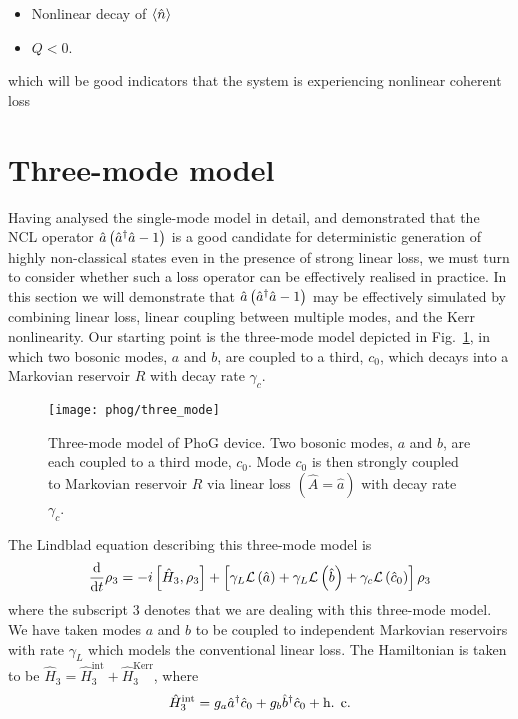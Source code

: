 \begin{itemize}
\item Nonlinear decay of $\ev{\hat{n}}$
\item $Q < 0$.
\end{itemize}

\noindent which will be good indicators that the system is experiencing nonlinear coherent loss





\section{Three-mode model}
Having analysed the single-mode model in detail, and demonstrated that the NCL operator $\hat{a}\left(\hat{a}^\dagger \hat{a} - 1\right)$ is a good candidate for deterministic generation of highly non-classical states even in the presence of strong linear loss, we must turn to consider whether such a loss operator can be effectively realised in practice. In this section we will demonstrate that $\hat{a}\left(\hat{a}^\dagger \hat{a} - 1\right)$ may be effectively simulated by combining linear loss, linear coupling between multiple modes, and the Kerr nonlinearity. Our starting point is the three-mode model depicted in Fig.~\ref{fig:phog_three_mode}, in which two bosonic modes, $a$ and $b$, are coupled to a third, $c_0$, which decays into a Markovian reservoir $R$ with decay rate $\gamma_c$. 

\begin{figure}[htp]
\centering
\texttt{[image: phog/three\_mode]}
\caption{\label{fig:phog_three_mode} Three-mode model of PhoG device. Two bosonic modes, $a$ and $b$, are each coupled to a third mode, $c_0$. Mode $c_0$ is then strongly coupled to Markovian reservoir $R$ via linear loss $\left(\hat{A} = \hat{a}\right)$ with decay rate $\gamma_c$. }
\end{figure}

The Lindblad equation describing this three-mode model is
\begin{equation}\label{eqn:phog_lindblad_three_mode_model}
\frac{\mathrm{d}}{\mathrm{d}t} \rho_3 = - i \left[ \hat{H}_3, \rho_3\right] + \left[ \gamma_L \mathcal{L}\left(\hat{a}\right) + \gamma_L \mathcal{L}\left(\hat{b}\right) + \gamma_c \mathcal{L}\left(\hat{c}_0\right)\right] \rho_3
\end{equation}
where the subscript $3$ denotes that we are dealing with this three-mode model. We have taken modes $a$ and $b$ to be coupled to independent Markovian reservoirs with rate $\gamma_L$ which models the conventional linear loss. The Hamiltonian is taken to be $\hat{H}_3 = \hat{H}_3^{\text{int}} + \hat{H}_3^{\text{Kerr}}$, where
\begin{align}
\hat{H}_3^{\text{int}} = g_a \hat{a}^\dagger \hat{c}_0 + g_b \hat{b}^\dagger \hat{c}_0 + \text{h. c.}
\end{align}











